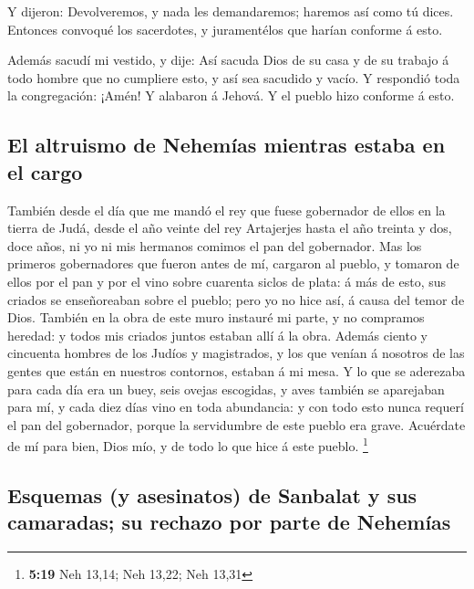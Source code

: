  Y dijeron: Devolveremos, y nada les demandaremos; haremos
así como tú dices. Entonces convoqué los sacerdotes, y juramentélos que
harían conforme á esto.

 Además sacudí mi vestido, y dije: Así sacuda Dios de su
casa y de su trabajo á todo hombre que no cumpliere esto, y así sea
sacudido y vacío. Y respondió toda la congregación: ¡Amén! Y alabaron á
Jehová. Y el pueblo hizo conforme á esto.

\hypertarget{el-altruismo-de-nehemuxedas-mientras-estaba-en-el-cargo}{%
\subsection{El altruismo de Nehemías mientras estaba en el
cargo}\label{el-altruismo-de-nehemuxedas-mientras-estaba-en-el-cargo}}

 También desde el día que me mandó el rey que fuese
gobernador de ellos en la tierra de Judá, desde el año veinte del rey
Artajerjes hasta el año treinta y dos, doce años, ni yo ni mis hermanos
comimos el pan del gobernador.  Mas los primeros
gobernadores que fueron antes de mí, cargaron al pueblo, y tomaron de
ellos por el pan y por el vino sobre cuarenta siclos de plata: á más de
esto, sus criados se enseñoreaban sobre el pueblo; pero yo no hice así,
á causa del temor de Dios.  También en la obra de este muro
instauré mi parte, y no compramos heredad: y todos mis criados juntos
estaban allí á la obra.  Además ciento y cincuenta hombres
de los Judíos y magistrados, y los que venían á nosotros de las gentes
que están en nuestros contornos, estaban á mi mesa.  Y lo
que se aderezaba para cada día era un buey, seis ovejas escogidas, y
aves también se aparejaban para mí, y cada diez días vino en toda
abundancia: y con todo esto nunca requerí el pan del gobernador, porque
la servidumbre de este pueblo era grave.  Acuérdate de mí
para bien, Dios mío, y de todo lo que hice á este pueblo. \footnote{\textbf{5:19}
  Neh 13,14; Neh 13,22; Neh 13,31}

\hypertarget{esquemas-y-asesinatos-de-sanbalat-y-sus-camaradas-su-rechazo-por-parte-de-nehemuxedas}{%
\subsection{Esquemas (y asesinatos) de Sanbalat y sus camaradas; su
rechazo por parte de
Nehemías}\label{esquemas-y-asesinatos-de-sanbalat-y-sus-camaradas-su-rechazo-por-parte-de-nehemuxedas}}

